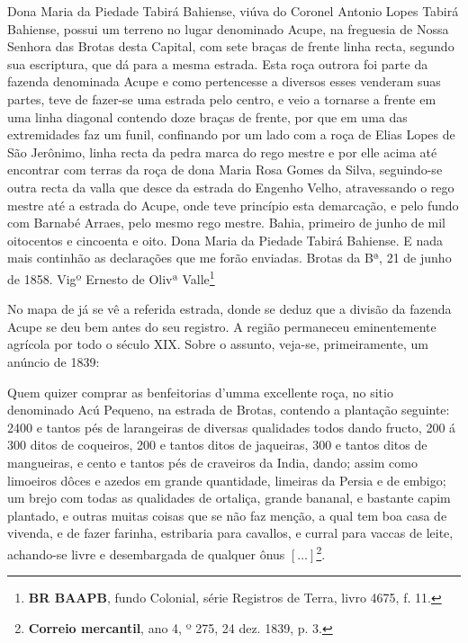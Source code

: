 \begin{citacao}
Dona Maria da Piedade Tabirá Bahiense, viúva do Coronel Antonio Lopes Tabirá Bahiense, possui um terreno no lugar denominado Acupe, na freguesia de Nossa Senhora das Brotas desta Capital, com sete braças de frente linha recta, segundo sua escriptura, que dá para a mesma estrada. Esta roça outrora foi parte da fazenda denominada Acupe e como pertencesse a diversos esses venderam suas partes, teve de fazer-se uma estrada pelo centro, e veio a tornarse a frente em uma linha diagonal contendo doze braças de frente, por que em uma das extremidades faz um funil, confinando por um lado com a roça de Elias Lopes de São Jerônimo, linha recta da pedra marca do rego mestre e por elle acima até encontrar com terras da roça de dona Maria Rosa Gomes da Silva, seguindo-se outra recta da valla que desce da estrada do Engenho Velho, atravessando o rego mestre até a estrada do Acupe, onde teve princípio esta demarcação, e pelo fundo com Barnabé Arraes, pelo mesmo rego mestre. Bahia, primeiro de junho de mil oitocentos e cincoenta e oito. Dona Maria da Piedade Tabirá Bahiense. E nada mais continhão as declarações que me forão enviadas. Brotas da Bª, 21 de junho de 1858. Vigº Ernesto de Olivª Valle\footnote{\textbf{BR BAAPB}, fundo Colonial, série Registros de Terra, livro 4675, f. 11.}
\end{citacao}

No mapa de  já se vê a referida estrada, donde se deduz que a divisão da fazenda Acupe se deu bem antes do seu registro. A região permaneceu eminentemente agrícola por todo o século XIX. Sobre o assunto, veja-se, primeiramente, um anúncio de 1839:

\begin{citacao}
Quem quizer comprar as benfeitorias d'umma excellente roça, no sitio denominado Acú Pequeno, na estrada de Brotas, contendo a plantação seguinte: 2400 e tantos pés de larangeiras de diversas qualidades todos dando fructo, 200 á 300 ditos de coqueiros, 200 e tantos ditos de jaqueiras, 300 e tantos ditos de mangueiras, e cento e tantos pés de craveiros da India, dando; assim como limoeiros dôces e azedos em grande quantidade, limeiras da Persia e de embigo; um brejo com todas as qualidades de ortaliça, grande bananal, e bastante capim plantado, e outras muitas coisas que se não faz menção, a qual tem boa casa de vivenda, e de fazer farinha, estribaria para cavallos, e curral para vaccas de leite, achando-se livre e desembargada de qualquer ônus \([\dots]\)\footnote{\textbf{Correio mercantil}, ano 4, º 275, 24 dez. 1839, p. 3.}.
\end{citacao}

